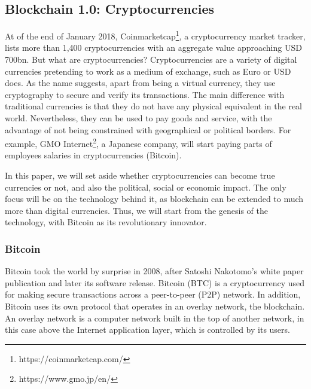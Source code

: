 \subsection{Blockchain 1.0: Cryptocurrencies}

At of the end of January 2018, Coinmarketcap\footnote{https://coinmarketcap.com/}, a cryptocurrency market tracker, lists more than 1,400 cryptocurrencies with an aggregate value approaching USD 700bn. But what are cryptocurrencies? Cryptocurrencies are a variety of digital currencies pretending to work as a medium of exchange, such as Euro or USD does. As the name suggests, apart from being a virtual currency, they use cryptography to secure and verify its transactions. The main difference with traditional currencies is that they do not have any physical equivalent in the real world. Nevertheless, they can be used to pay goods and service, with the advantage of not being constrained with geographical or political borders. For example, GMO Internet\footnote{https://www.gmo.jp/en/}, a Japanese company, will start paying parts of employees salaries in cryptocurrencies (Bitcoin).

In this paper, we will set aside whether cryptocurrencies can become true currencies or not, and also the political, social or economic impact. The only focus will be on the technology behind it, as blockchain can be extended to much more than digital currencies. Thus, we will start from the genesis of the technology, with Bitcoin as its revolutionary innovator.


\subsubsection{Bitcoin}

Bitcoin took the world by surprise in 2008, after Satoshi Nakotomo's white paper publication \cite{nakamoto2008bitcoin} and later its software release. Bitcoin (BTC) is a cryptocurrency used for making secure transactions across a peer-to-peer (P2P) network. In addition, Bitcoin uses its own protocol that operates in an overlay network, the blockchain. An overlay network is a computer network built in the top of another network, in this case above the Internet application layer, which is controlled by its users.

